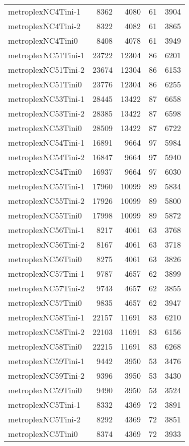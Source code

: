 \begin{longtable}{lrrrr}
metroplexNC4Tini-1 & 8362 & 4080 & 61 & 3904 \\
metroplexNC4Tini-2 & 8322 & 4082 & 61 & 3865 \\
metroplexNC4Tini0 & 8408 & 4078 & 61 & 3949 \\
metroplexNC51Tini-1 & 23722 & 12304 & 86 & 6201 \\
metroplexNC51Tini-2 & 23674 & 12304 & 86 & 6153 \\
metroplexNC51Tini0 & 23776 & 12304 & 86 & 6255 \\
metroplexNC53Tini-1 & 28445 & 13422 & 87 & 6658 \\
metroplexNC53Tini-2 & 28385 & 13422 & 87 & 6598 \\
metroplexNC53Tini0 & 28509 & 13422 & 87 & 6722 \\
metroplexNC54Tini-1 & 16891 & 9664 & 97 & 5984 \\
metroplexNC54Tini-2 & 16847 & 9664 & 97 & 5940 \\
metroplexNC54Tini0 & 16937 & 9664 & 97 & 6030 \\
metroplexNC55Tini-1 & 17960 & 10099 & 89 & 5834 \\
metroplexNC55Tini-2 & 17926 & 10099 & 89 & 5800 \\
metroplexNC55Tini0 & 17998 & 10099 & 89 & 5872 \\
metroplexNC56Tini-1 & 8217 & 4061 & 63 & 3768 \\
metroplexNC56Tini-2 & 8167 & 4061 & 63 & 3718 \\
metroplexNC56Tini0 & 8275 & 4061 & 63 & 3826 \\
metroplexNC57Tini-1 & 9787 & 4657 & 62 & 3899 \\
metroplexNC57Tini-2 & 9743 & 4657 & 62 & 3855 \\
metroplexNC57Tini0 & 9835 & 4657 & 62 & 3947 \\
metroplexNC58Tini-1 & 22157 & 11691 & 83 & 6210 \\
metroplexNC58Tini-2 & 22103 & 11691 & 83 & 6156 \\
metroplexNC58Tini0 & 22215 & 11691 & 83 & 6268 \\
metroplexNC59Tini-1 & 9442 & 3950 & 53 & 3476 \\
metroplexNC59Tini-2 & 9396 & 3950 & 53 & 3430 \\
metroplexNC59Tini0 & 9490 & 3950 & 53 & 3524 \\
metroplexNC5Tini-1 & 8332 & 4369 & 72 & 3891 \\
metroplexNC5Tini-2 & 8292 & 4369 & 72 & 3851 \\
metroplexNC5Tini0 & 8374 & 4369 & 72 & 3933 \\

\end{longtable}
